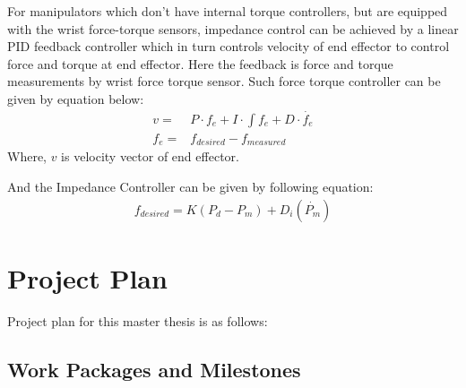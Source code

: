 \documentclass[thesis]{mas_proposal}
\begin{document}
For manipulators which don't have internal torque controllers, but are equipped with the wrist force-torque sensors, impedance control can be achieved by a linear PID feedback controller which in turn controls velocity of end effector to control force and torque at end effector. Here the feedback is force and torque measurements by wrist force torque sensor. Such force torque controller can be given by equation below:
\begin{align}
	v =& P \cdot f_{e} + I \cdot \int f_{e} + D \cdot \dot{f_{e}} \\
	f_{e} =& f_{desired} - f_{measured}
\end{align}   
Where, $v$ is velocity vector of end effector.

And the Impedance Controller can be given by following equation:
\begin{align}
	f_{desired} = K(P_{d} - P_{m}) + D_{i}(\dot{P_{m}})
\end{align}



\chapter{Project Plan}
Project plan for this master thesis is as follows:
\section{Work Packages and Milestones}
\end{document}
